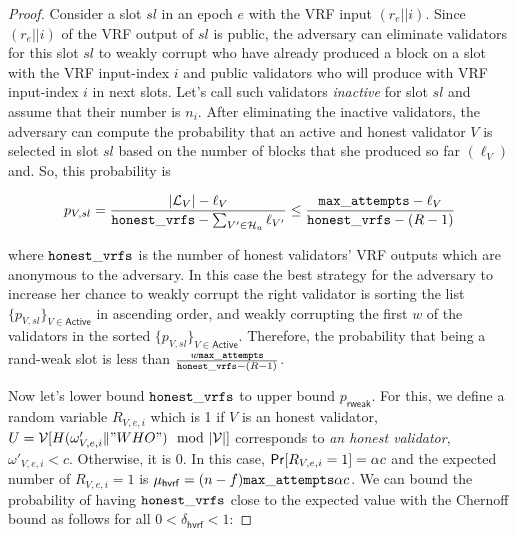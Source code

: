 \begin{proof}
	Consider a slot $ sl $ in an epoch $ e $ with the VRF input $ (r_e||i) $. Since $ (r_e||i) $ of the VRF output of $ sl $ is public, the adversary can eliminate validators for this slot $ sl $ to weakly corrupt who have already produced a block on a slot with the VRF input-index $ i $ and public validators who will produce with VRF input-index $ i $ in next slots. Let's call such validators \emph{inactive} for slot $ sl $ and assume that their number is $ n_i $. After eliminating the inactive validators, the adversary can compute the probability that an active  and honest validator $ V $ is selected in slot $ sl $ based on the number of blocks that she produced so far $ (\ell_V) $ and. So, this probability is
	
	
	\begin{equation}\label{eq:prVs}
	p_{V,sl} = \frac{|\mathcal{L}_V|- \ell_V}{\mathtt{honest\_vrfs} - \sum_{V' \in \mathcal{H}_a}\ell_{V'}}\leq \frac{\mathtt{max\_attempts} - \ell_V}{\mathtt{honest\_vrfs} - (R-1)}
	\end{equation}
	
	
	where $ \mathtt{honest\_vrfs} $ is the number of honest validators' VRF outputs which are anonymous to the adversary.
	In this case the best strategy for the adversary to increase her chance to  weakly corrupt the right validator  is sorting the list $ \{p_{V,sl}\}_{V \in \mathsf{Active}} $ in ascending order, and weakly corrupting the first $ w $ of the validators in the sorted $ \{p_{V,sl}\}_{V \in \mathsf{Active}} $. Therefore, the probability that being a rand-weak slot is less than $  \frac{w\mathtt{max\_attempts} }{\mathtt{honest\_vrfs} - (R-1)}  $.
	
	Now let's lower bound $ \mathtt{honest\_vrfs} $ to upper bound $ p_{\mathsf{rweak}} $.	For this, we define a random variable $ R_{V,e,i} $ which is 1 if $ V $ is an honest validator, $ U = \mathcal{V}[H(\omega'_{V,e,i} \| "WHO") \mod |\mathcal{V}|]  $ corresponds to  \emph{an honest validator}, $ \omega'_{V,e,i} < c $. Otherwise, it is 0.  In this case, $ \mathsf{Pr}[R_{V,e,i} = 1] = \alpha c$ and
	the expected number of $ R_{V,e,i}  = 1$ is  $ \mu_{\mathsf{hvrf}} = (n-f) \mathtt{max\_attempts} \alpha c $. We can bound the probability of having $ \mathtt{honest\_vrfs} $ close to the expected value with  the Chernoff bound as follows for all $ 0 <\delta_{\mathsf{hvrf}} < 1 	 $:
	

\end{proof}
